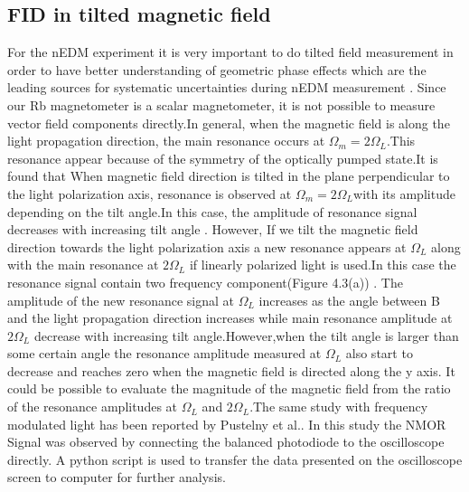 \subsection{FID in tilted magnetic field}
For the nEDM experiment it is very important to do tilted field measurement in order to have better understanding of  geometric phase effects which are the leading sources for systematic uncertainties during nEDM measurement . 
Since our Rb magnetometer is a scalar magnetometer, it is not possible to measure vector field components directly.In general, when the magnetic field is along the light propagation direction, the main resonance occurs at $\Omega_m = 2\Omega_L$.This resonance appear because of the symmetry of the optically pumped state.It is found that When magnetic field direction is tilted in the plane perpendicular to the light polarization axis, resonance is observed at  $\Omega_m = 2\Omega_L$with its amplitude depending on the tilt angle.In this case, the amplitude of resonance signal decreases with increasing tilt angle . However, If we tilt the magnetic field direction towards the light polarization axis a new resonance appears at $\Omega_L$ along with the main resonance at $2\Omega_L$ if linearly polarized light is used.In this case the resonance signal contain two frequency component(Figure 4.3(a)) . The amplitude of the new resonance signal at $\Omega_L$  increases as the angle between B and the light propagation direction increases while main resonance amplitude at $2\Omega_L$  decrease with increasing tilt angle.However,when the tilt angle is larger than some certain angle the resonance amplitude measured at $\Omega_L$ also start to decrease and reaches zero when the magnetic field is directed along the y axis.   It could be possible to evaluate the magnitude of the magnetic field from the ratio of the resonance amplitudes at $\Omega_L$ and $2\Omega_L$.The same study with frequency modulated light has been reported by Pustelny et al.\cite{PhysRevA.74.063420}. In this study the NMOR Signal was observed by connecting the balanced photodiode to the oscilloscope directly. A python script is used to transfer the data presented on the oscilloscope screen to computer for further analysis. 


